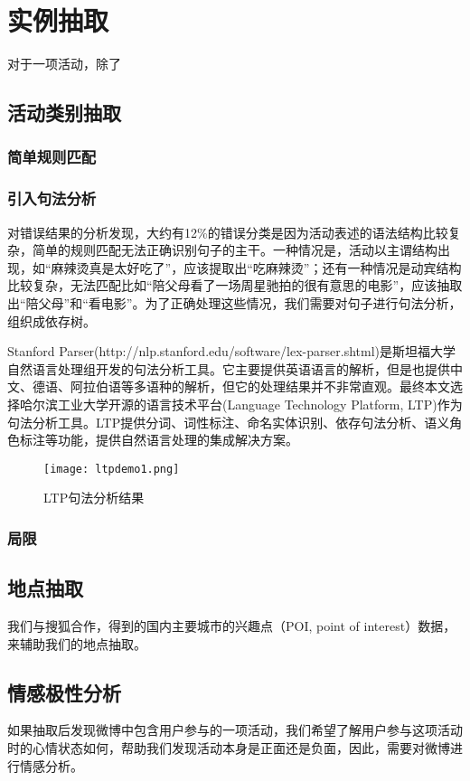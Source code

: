 \chapter{实例抽取}
对于一项活动，除了

\section{活动类别抽取}
\subsection{简单规则匹配}
\subsection{引入句法分析}
对错误结果的分析发现，大约有12\%的错误分类是因为活动表述的语法结构比较复杂，简单的规则匹配无法正确识别句子的主干。一种情况是，活动以主谓结构出现，如``麻辣烫真是太好吃了''，应该提取出``吃麻辣烫''；还有一种情况是动宾结构比较复杂，无法匹配比如``陪父母看了一场周星驰拍的很有意思的电影''，应该抽取出``陪父母''和``看电影''。为了正确处理这些情况，我们需要对句子进行句法分析，组织成依存树。

Stanford Parser(http://nlp.stanford.edu/software/lex-parser.shtml)是斯坦福大学自然语言处理组开发的句法分析工具。它主要提供英语语言的解析，但是也提供中文、德语、阿拉伯语等多语种的解析，但它的处理结果并不非常直观。最终本文选择哈尔滨工业大学开源的语言技术平台(Language Technology Platform, LTP)\cite{che2010ltp}作为句法分析工具。LTP提供分词、词性标注、命名实体识别、依存句法分析、语义角色标注等功能，提供自然语言处理的集成解决方案。

\begin{figure}[!h]
\centering
\texttt{[image: ltpdemo1.png]}
\caption{LTP句法分析结果}
\label{fig:ltp_demo}
\end{figure}


\subsection{局限}

\section{地点抽取}

我们与搜狐合作，得到的国内主要城市的兴趣点（POI, point of interest）数据，来辅助我们的地点抽取。

\section{情感极性分析}
如果抽取后发现微博中包含用户参与的一项活动，我们希望了解用户参与这项活动时的心情状态如何，帮助我们发现活动本身是正面还是负面，因此，需要对微博进行情感分析。

